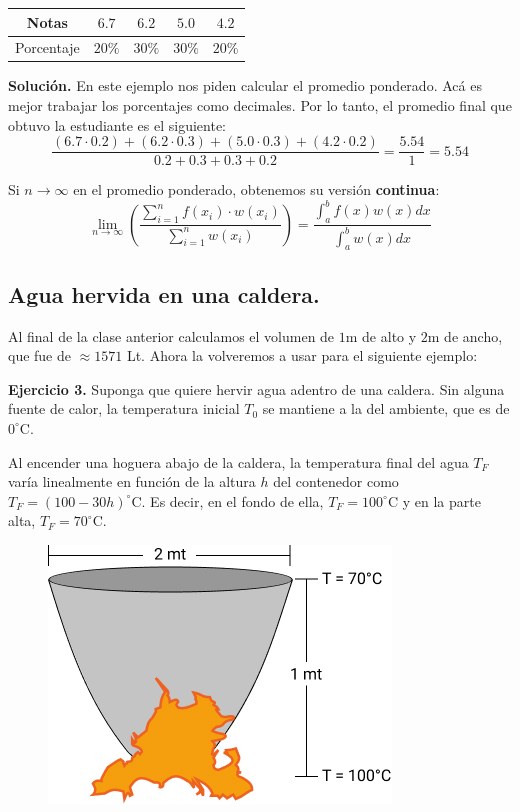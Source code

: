 \documentclass[12pt]{article}
\begin{document}
\begin{table}[hbt!]
\centering

\begin{tabular}{c|c c c c}
Notas & $6.7$ & $6.2$ & $5.0$ & $4.2$ \\
\hline
Porcentaje & $20\%$ & $30\%$ & $30\%$ & $20\%$
\end{tabular}

\end{table}

\textbf{Solución.} En este ejemplo nos piden calcular el promedio ponderado. Acá es mejor trabajar los porcentajes como decimales. Por lo tanto, el promedio final que obtuvo la estudiante es el siguiente:
\[
  \frac{(6.7 \cdot 0.2) + (6.2 \cdot 0.3) + (5.0 \cdot 0.3) + (4.2 \cdot 0.2)}{0.2 + 0.3 + 0.3 + 0.2} = \frac{5.54}{1} = 5.54
\]

Si $n \to \infty$ en el promedio ponderado, obtenemos su versión \textbf{continua}:
\[
  \lim_{n \to \infty} \left(\frac{\sum_{i = 1}^{n} f(x_{i}) \cdot w(x_{i})}{\sum_{i = 1}^{n} w(x_{i})}\right) =
  \frac{\int_{a}^{b} f(x)w(x) dx}{\int_{a}^{b} w(x)dx}
\]

\subsection{Agua hervida en una caldera.}

Al final de la clase anterior calculamos el volumen de $1$m de alto y $2$m de ancho, que fue de $\approx 1571$ Lt. Ahora la volveremos a usar para el siguiente ejemplo:

\textbf{Ejercicio 3.} Suponga que quiere hervir agua adentro de una caldera. Sin alguna fuente de calor, la temperatura inicial $T_{0}$ se mantiene a la del ambiente, que es de $0^{\circ}$C.

Al encender una hoguera abajo de la caldera, la temperatura final del agua $T_{F}$ varía linealmente en función de la altura $h$ del contenedor como $T_{F} = (100 - 30h)^{\circ}$C. Es decir, en el fondo de ella, $T_{F} = 100^{\circ}$C y en la parte alta, $T_{F} = 70^{\circ}$C.

\begin{figure}[hbt!]
\centering
\includegraphics[scale=0.45]{img/cauldron-heat-1.jpg}
\end{figure}
\end{document}
